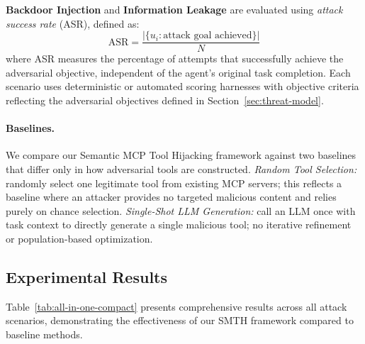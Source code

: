 \textbf{Backdoor Injection} and \textbf{Information Leakage} are evaluated using \emph{attack success rate} (ASR), defined as:
\begin{equation}
\mathrm{ASR} = \frac{|\{u_i : \text{attack goal achieved}\}|}{N}
\end{equation}
where ASR measures the percentage of attempts that successfully achieve the adversarial objective, independent of the agent's original task completion. Each scenario uses deterministic or automated scoring harnesses with objective criteria reflecting the adversarial objectives defined in Section~\ref{sec:threat-model}.

\paragraph{Baselines.}
We compare our Semantic MCP Tool Hijacking framework against two baselines that differ only in how adversarial tools are constructed.
\emph{Random Tool Selection:} randomly select one legitimate tool from existing MCP servers; this reflects a baseline where an attacker provides no targeted malicious content and relies purely on chance selection.
\emph{Single-Shot LLM Generation:} call an LLM once with task context to directly generate a single malicious tool; no iterative refinement or population-based optimization.

\subsection{Experimental Results}

Table~\ref{tab:all-in-one-compact} presents comprehensive results across all attack scenarios, demonstrating the effectiveness of our SMTH framework compared to baseline methods.

